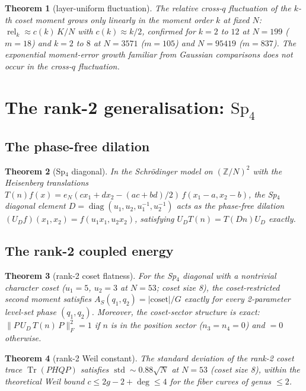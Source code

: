 \documentclass[11pt]{article}
\newtheorem{theorem}{Theorem}[section]
\begin{document}
\begin{theorem}[layer-uniform fluctuation]\label{thm:layers}
The relative cross-$q$ fluctuation of the $k$-th coset moment grows
only linearly in the moment order $k$ at fixed $N$:
$\operatorname{rel}_k \approx c(k)\,K/N$ with $c(k) \approx k/2$,
confirmed for $k = 2$ to $12$ at $N = 199$ ($m = 18$) and $k = 2$ to
$8$ at $N = 3571$ ($m = 105$) and $N = 95419$ ($m = 837$).  The
exponential moment-error growth familiar from Gaussian comparisons
does not occur in the cross-$q$ fluctuation.
\end{theorem}

\section{The rank-2 generalisation: \texorpdfstring{$\mathrm{Sp}_4$}{Sp4}}
\label{sec:rank2}

\subsection{The phase-free dilation}

\begin{theorem}[Sp$_4$ diagonal]\label{thm:sp4dilation}
In the Schr\"odinger model on $(\mathbb{Z}/N)^2$ with the Heisenberg
translations $T(n)f(x) = e_N(c x_1 + d x_2 - (ac{+}bd)/2)\,
f(x_1{-}a, x_2{-}b)$, the Sp$_4$ diagonal element
$D = \operatorname{diag}(u_1, u_2, u_1^{-1}, u_2^{-1})$ acts as the
phase-free dilation $(U_D f)(x_1, x_2) = f(u_1 x_1, u_2 x_2)$,
satisfying $U_D T(n) = T(Dn) U_D$ exactly.
\end{theorem}

\subsection{The rank-2 coupled energy}

\begin{theorem}[rank-2 coset flatness]\label{thm:rank2flat}
For the Sp$_4$ diagonal with a nontrivial character coset ($u_1 = 5$,
$u_2 = 3$ at $N = 53$; coset size 8), the coset-restricted second
moment satisfies
$A_S(q_1,q_2) = |\mathrm{coset}|/G$ exactly for every 2-parameter
level-set phase $(q_1,q_2)$.  Moreover, the coset-sector structure is
exact: $\|P\,U_D\,T(n)\,P\|_F^2 = 1$ if $n$ is in the position sector
($n_3 = n_4 = 0$) and $= 0$ otherwise.
\end{theorem}

\begin{theorem}[rank-2 Weil constant]\label{thm:rank2weil}
The standard deviation of the rank-2 coset trace
$\operatorname{Tr}(PHQP)$ satisfies
$\operatorname{std} \sim 0.88\sqrt{N}$ at $N = 53$ (coset size 8),
within the theoretical Weil bound $c \le 2g - 2 + \deg \le 4$ for
the fiber curves of genus $\le 2$.
\end{theorem}
\end{document}
